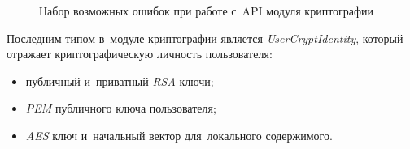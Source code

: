 \begin{figure}[h]
	
   \caption{Набор возможных ошибок при работе с~API модуля криптографии}
   \label{sec:development:client:encryption:code:errors}
\end{figure}

Последним типом в~модуле криптографии является \textit{UserCryptIdentity}, который отражает криптографическую личность пользователя:
\begin{itemize}
	\item публичный и~приватный \textit{RSA} ключи;
	\item \textit{PEM} публичного ключа пользователя;
	\item \textit{AES} ключ и~начальный вектор для~локального содержимого.
\end{itemize}